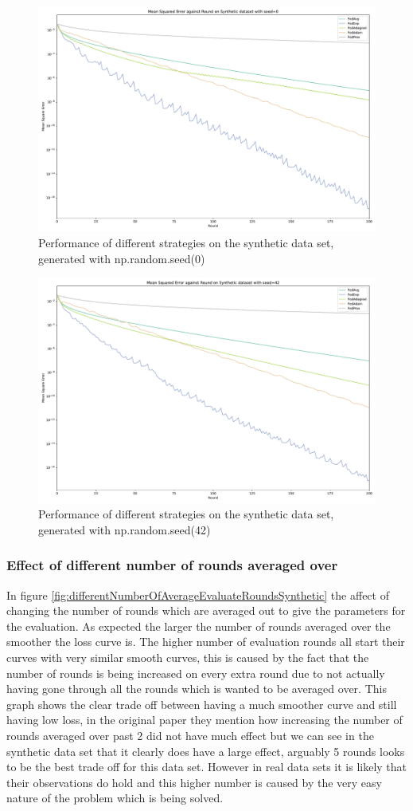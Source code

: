 \documentclass{article}
\begin{document}
\begin{figure}
    \centerline{\includegraphics[width=.6\linewidth]{figs/syntheticSeed0_200Rounds.pdf}}
    \caption{Performance of different strategies on the synthetic data set, generated with np.random.seed(0)}
    \label{fig:200RoundsSeed0}
\end{figure}

\begin{figure}
    \centerline{\includegraphics[width=.6\linewidth]{figs/syntheticSeed42_200Rounds.pdf}}
    \caption{Performance of different strategies on the synthetic data set, generated with np.random.seed(42)}
    \label{fig:200RoundsSeed42}
\end{figure}


\subsubsection{Effect of different number of rounds averaged over}

In figure \ref{fig:differentNumberOfAverageEvaluateRoundsSynthetic} the affect of changing the number of rounds which are averaged out to give the parameters for the evaluation.  As expected the larger the number of rounds averaged over the smoother the loss curve is.  The higher number of evaluation rounds all start their curves with very similar smooth curves, this is caused by the fact that the number of rounds is being increased on every extra round due to not actually having gone through all the rounds which is wanted to be averaged over.  This graph shows the clear trade off between having a much smoother curve and still having low loss, in the original paper they mention how increasing the number of rounds averaged over past 2 did not have much effect but we can see in the synthetic data set that it clearly does have a large effect, arguably 5 rounds looks to be the best trade off for this data set.  However in real data sets it is likely that their observations do hold and this higher number is caused by the very easy nature of the problem which is being solved. 
\end{document}
